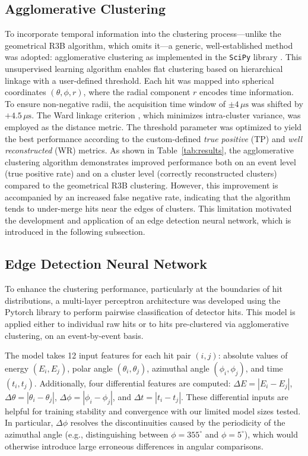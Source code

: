 \documentclass[review,sort&compress]{elsarticle}
\begin{document}
\subsection{Agglomerative Clustering}\label{s_sec:agglo}
To incorporate temporal information into the clustering process---unlike the geometrical R3B algorithm, which omits it---a generic, well-established method was adopted: agglomerative clustering \cite{Nielsen2016} as implemented in the \texttt{SciPy} library \cite{virtanen2020scipy}. This unsupervised learning algorithm enables flat clustering based on hierarchical linkage with a user-defined threshold.\newline
Each hit was mapped into spherical coordinates \((\theta, \phi, r)\), where the radial component \(r\) encodes time information. To ensure non-negative radii, the acquisition time window of \(\pm 4\,\mu\mathrm{s}\) was shifted by \(+4.5\,\mu\mathrm{s}\). The Ward linkage criterion \cite{nielsen2016hierarchical}, which minimizes intra-cluster variance, was employed as the distance metric.\newline
The threshold parameter was optimized to yield the best performance according to the custom-defined \textit{true positive} (TP) and \textit{well reconstructed} (WR) metrics.\newline
As shown in Table~\ref{tab:results}, the agglomerative clustering algorithm demonstrates improved performance both on an event level (true positive rate) and on a cluster level (correctly reconstructed clusters) compared to the geometrical R3B clustering. However, this improvement is accompanied by an increased false negative rate, indicating that the algorithm tends to under-merge hits near the edges of clusters. This limitation motivated the development and application of an edge detection neural network, which is introduced in the following subsection.


\subsection{Edge Detection Neural Network}\label{s_sec:edge}
To enhance the clustering performance, particularly at the boundaries of hit distributions, a multi-layer perceptron architecture was developed using the Pytorch library \cite{imambi2021pytorch} to perform pairwise classification of detector hits. This model is applied either to individual raw hits or to hits pre-clustered via agglomerative clustering, on an event-by-event basis.

The model takes 12 input features for each hit pair $(i, j)$: absolute values of energy $(E_i, E_j)$, polar angle $(\theta_i, \theta_j)$, azimuthal angle $(\phi_i, \phi_j)$, and time $(t_i, t_j)$. Additionally, four differential features are computed: $\Delta E = |E_i - E_j|$, $\Delta \theta = |\theta_i - \theta_j|$, $\Delta \phi = |\phi_i - \phi_j|$, and $\Delta t = |t_i - t_j|$. These differential inputs are helpful for training stability and convergence with our limited model sizes tested. In particular, $\Delta \phi$ resolves the discontinuities caused by the periodicity of the azimuthal angle (e.g., distinguishing between $\phi = 355^\circ$ and $\phi = 5^\circ$), which would otherwise introduce large erroneous differences in angular comparisons.
\end{document}
